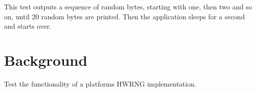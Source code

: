 This test outputs a sequence of random bytes, starting with one, then two and so on, until 20 random bytes are printed. Then the application sleeps for a second and starts over.

\section*{Background }

Test the functionality of a platforms H\+W\+R\+NG implementation. 